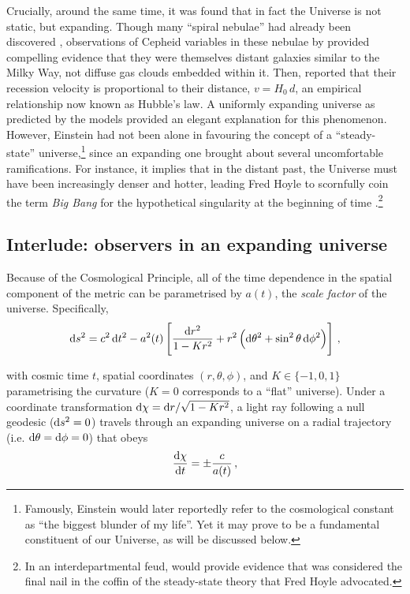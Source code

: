 Crucially, around the same time, it was found that in fact the Universe is not static, but expanding. Though many ``spiral nebulae'' had already been discovered \citep[e.g.][]{964AlSufi}, observations of Cepheid variables in these nebulae by \citet{1925ApJ....62..409H, 1926ApJ....63..236H} provided compelling evidence that they were themselves distant galaxies similar to the Milky Way, not diffuse gas clouds embedded within it. Then, \citet{1929PNAS...15..168H} reported that their recession velocity is proportional to their distance, $v = H_0 \, d$, an empirical relationship now known as Hubble's law. A uniformly expanding universe as predicted by the \citeauthor{1922ZPhy...10..377F} models provided an elegant explanation for this phenomenon. However, Einstein had not been alone in favouring the concept of a ``steady-state'' universe,\footnote{Famously, Einstein would later reportedly refer to the cosmological constant as ``the biggest blunder of my life''. Yet it may prove to be a fundamental constituent of our Universe, as will be discussed below.} since an expanding one brought about several uncomfortable ramifications. For instance, it implies that in the distant past, the Universe must have been increasingly denser and hotter, leading Fred Hoyle to scornfully coin the term \textit{Big Bang} for the hypothetical singularity at the beginning of time \citep[already considered by][]{1927PhDT.........6L}.\footnote{In an interdepartmental feud, \citet{1961MNRAS.122..349R} would provide evidence that was considered the final nail in the coffin of the steady-state theory that Fred Hoyle advocated.}

\subsection{Interlude: observers in an expanding universe}
\label{chIssec:Observers_in_an_expanding_universe}

Because of the Cosmological Principle, all of the time dependence in the spatial component of the metric can be parametrised by $a(t)$, the \textit{scale factor} of the universe. Specifically,
\begin{equation}
    \label{chIeq:FLRW_metric}
    \dif s^2 = c^2 \dif t^2 - a^2(t) \left[ \frac{\dif r^2}{1 - Kr^2} + r^2 \left( \dif \theta^2 + \sin^2 \theta \dif \phi^2 \right) \right] \, ,
\end{equation}

\noindent with cosmic time $t$, spatial coordinates $(r, \theta, \phi)$, and $K \in \{ -1, 0, 1 \}$ parametrising the curvature ($K = 0$ corresponds to a ``flat'' universe). Under a coordinate transformation $\dif \chi = \dif r / \sqrt{1 - Kr^2}$, a light ray following a null geodesic ($\dif s^2 = 0$) travels through an expanding universe on a radial trajectory (i.e. $\dif \theta = \dif \phi = 0$) that obeys
\begin{equation}
    \label{chIeq:Null_geodesic}
    \frac{\dif \chi}{\dif t} = \pm \frac{c}{a(t)} \, ,
\end{equation}


